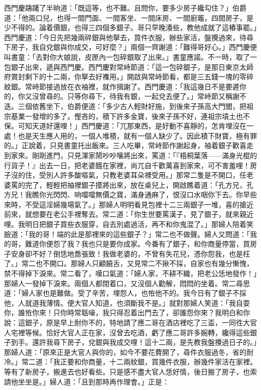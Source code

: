 西門慶躊躇了半晌道：「既這等，也不難。且問你，要多少房子纔勾住？」伯爵道：「他兩口兒，也得一間門面、一間客坐、一間床房、一間廚竈，四間房子，是少不得的。論着價銀，也得三四個多銀子。哥只早晚湊些，教他成就了這樁事罷。」西門慶道：「今日先把幾兩碎銀與他拏去，買件衣服，辦些家活，盤攪過來，待尋下房子，我自兌銀與你成交，可好麼？」兩個一齊謝道：「難得哥好心。」西門慶便叫書童：「去對你大娘說，皮匣內一包碎銀取了出來。」書童應諾。不一時，取了一包銀子出來，遞與西門慶。西門慶對常峙節道：「這一包碎銀子，是那日東京太師府賞封剩下的十二兩，你拏去好襍用。」開啟與常峙節看，都是三五錢一塊的零碎紋銀。常峙節接過放在衣袖裡，就作揖謝了。西門慶道：「我這幾日不是要遲你的，你又沒曾尋的。只等你尋下，待我有銀，一起兌去便了。」常峙節又稱謝不迭。{}三個依舊坐下，伯爵便道：「多少古人輕財好施，到後來子孫高大門閭，把祖宗基業一發增的多了。慳吝的，積下許多金寶，後來子孫不好，連祖宗墳土也不保。可知天道好還哩！」西門慶道：「兀那東西，是好動不喜靜的，怎肯埋沒在一處！也是天生應人用的，一個人堆積，就有一個人缺少了。因此積下財寶，極有罪的。」{}正說着，只見書童托出飯來。三人吃畢，常峙節作謝起身，袖着銀子歡喜走到家來。剛剛進門，只見渾家鬧吵吵嚷將出來，罵道：「『梧桐葉落——滿身光棍的行貨子！』出去一日，把老婆餓在家裡，尚兀自千歡萬喜到家來，可不害羞哩！房子沒的住，受別人許多酸嘔氣，只教老婆耳朵裡受用。」那常二隻是不開口，{}任老婆罵的完了，輕輕把袖裡銀子摸將出來，放在桌兒上，開啟瞧着道：「孔方兄，孔方兄！我瞧你光閃閃、响噹噹無價之寶，滿身通麻了，恨沒口水咽你下去。你早些來時，不受這淫婦幾場氣了。」{}那婦人明明看見包裡十二三兩銀子一堆，喜的搶近前來，就想要在老公手裡奪去。{}常二道：「你生世要罵漢子，見了銀子，就來親近哩。我明日把銀子買些衣服穿，自去別處過活，再不和你鬼混了。」那婦人陪着笑臉道：「我的哥！端的此是那裡來的這些銀子？」常二也不做聲。婦人又問道：「我的哥，難道你便怨了我？我也只是要你成家。今番有了銀子，和你商量停當，買房子安身卻不好？倒恁地喬張致！我做老婆的，不曾有失花兒，憑你怨我，也是枉了。」常二也不開口。那婦人只顧饒舌，又見常二不揪不採，自家也有幾分慚愧，禁不得掉下淚來。常二看了，嘆口氣道：「婦人家，不耕不織，把老公恁地發作！」那婦人一發掉下淚來。{}兩個人都閉着口，又沒個人勸解，悶悶的坐着。{}常二尋思道：「婦人家也是難做。受了辛苦，埋怨人，也恠他不的。我今日有了銀子不採他，人就道我薄情。{}便大官人知道，也須斷我不是。」就對那婦人笑道：「我自耍你，誰恠你來！只你時常聒噪，我只得忍着出門去了，卻誰怨你來？我明白和你說：這銀子，原是早上耐你不的，特地請了應二哥在酒店裡吃了三盃，一同徃大官人宅裡等候。恰好大官人正在家，沒曾去吃酒，虧了應二哥許多婉轉，纔得這些銀子到手。還許我尋下房子，兌銀與我成交哩！這十二兩，是先教我盤攪過日子的。」那婦人道：「原來正是大官人與你的，如今不要花費開了，尋件衣服過冬，省的耐冷。」常二道：「我正要和你商量，十二兩紋銀，買幾件衣服，辦幾件家活在家裡。等有了新房子，搬進去也好看些。只是感不盡大官人恁好情，{}後日搬了房子，也索請他坐坐是。」婦人道：「且到那時再作理會。」正是：

